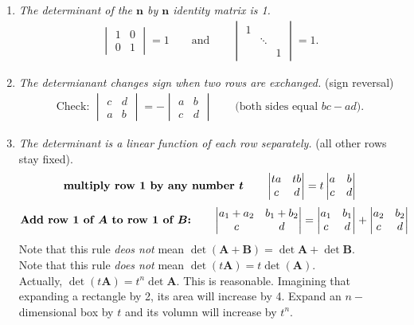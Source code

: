 \begin{enumerate}
\item
\emph{The determinant of the $\bm n$ by $\bm n$ identity matrix is 1.}
\begin{gather*}
\begin{vmatrix}1&0\\0&1\end{vmatrix}=1\qquad\text{and}\qquad\begin{vmatrix}
1&&\\&\ddots&\\&&1\end{vmatrix}=1.
\end{gather*}
\item
\emph{The determianant changes sign when two rows are exchanged.} (sign reversal)
\begin{gather*}
\text{Check:   }\begin{vmatrix}c&d\\a&b\end{vmatrix}=-\begin{vmatrix}a&b\\c&d\end{vmatrix}\qquad\text{(both sides equal $bc-ad$)}.
\end{gather*}
\item
\emph{The determinant is a linear function of each row separately.} (all other rows stay fixed).
\begin{gather*}
\text{\textbf{multiply row 1 by any number $\bm t$}}\qquad\begin{vmatrix}ta&tb\\c&d\end{vmatrix}=t\begin{vmatrix}a&b\\c&d\end{vmatrix}
\end{gather*}
\begin{gather*}
\text{\textbf{Add row 1 of $\bm A$ to row 1 of $\bm B$:}}\qquad\begin{vmatrix}a_1+a_2&b_1+b_2\\c&d\end{vmatrix}=\begin{vmatrix}a_1&b_1\\c&d\end{vmatrix}+\begin{vmatrix}a_2&b_2\\c&d\end{vmatrix}
\end{gather*}
Note that this rule \emph{deos not} mean $\det (\bm A+\bm B)=\det \bm A+\det\bm B$.\\ Note that this rule \emph{does not} mean $\det(t\bm A)=t\det(\bm A)$. \\Actually, $\det(t\bm A)=t^n\det \bm A$. This is reasonable. Imagining that expanding a rectangle by 2, its area will increase by 4. Expand an $n-$dimensional box by $t$ and its volumn will increase by $t^n$.\\

\end{enumerate}
